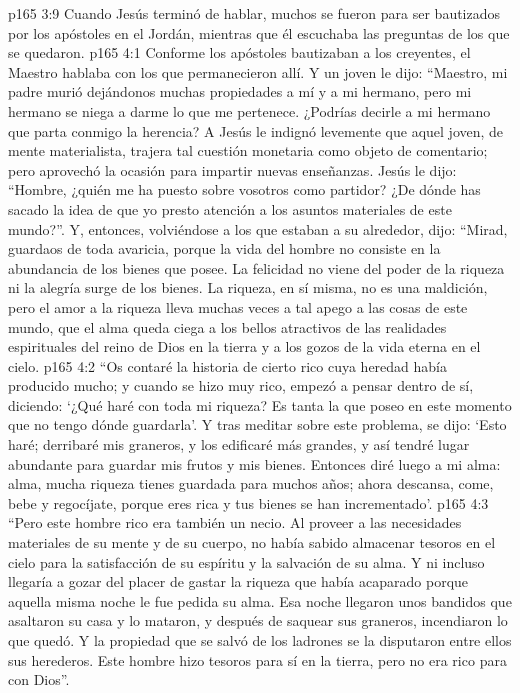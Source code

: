\vs p165 3:9 \pc Cuando Jesús terminó de hablar, muchos se fueron para ser bautizados por los apóstoles en el Jordán, mientras que él escuchaba las preguntas de los que se quedaron.
\vs p165 4:1 Conforme los apóstoles bautizaban a los creyentes, el Maestro hablaba con los que permanecieron allí. Y un joven le dijo: “Maestro, mi padre murió dejándonos muchas propiedades a mí y a mi hermano, pero mi hermano se niega a darme lo que me pertenece. ¿Podrías decirle a mi hermano que parta conmigo la herencia? A Jesús le indignó levemente que aquel joven, de mente materialista, trajera tal cuestión monetaria como objeto de comentario; pero aprovechó la ocasión para impartir nuevas enseñanzas. Jesús le dijo: “Hombre, ¿quién me ha puesto sobre vosotros como partidor? ¿De dónde has sacado la idea de que yo presto atención a los asuntos materiales de este mundo?”. Y, entonces, volviéndose a los que estaban a su alrededor, dijo: “Mirad, guardaos de toda avaricia, porque la vida del hombre no consiste en la abundancia de los bienes que posee. La felicidad no viene del poder de la riqueza ni la alegría surge de los bienes. La riqueza, en sí misma, no es una maldición, pero el amor a la riqueza lleva muchas veces a tal apego a las cosas de este mundo, que el alma queda ciega a los bellos atractivos de las realidades espirituales del reino de Dios en la tierra y a los gozos de la vida eterna en el cielo.
\vs p165 4:2 \pc “Os contaré la historia de cierto rico cuya heredad había producido mucho; y cuando se hizo muy rico, empezó a pensar dentro de sí, diciendo: ‘¿Qué haré con toda mi riqueza? Es tanta la que poseo en este momento que no tengo dónde guardarla’. Y tras meditar sobre este problema, se dijo: ‘Esto haré; derribaré mis graneros, y los edificaré más grandes, y así tendré lugar abundante para guardar mis frutos y mis bienes. Entonces diré luego a mi alma: alma, mucha riqueza tienes guardada para muchos años; ahora descansa, come, bebe y regocíjate, porque eres rica y tus bienes se han incrementado’.
\vs p165 4:3 “Pero este hombre rico era también un necio. Al proveer a las necesidades materiales de su mente y de su cuerpo, no había sabido almacenar tesoros en el cielo para la satisfacción de su espíritu y la salvación de su alma. Y ni incluso llegaría a gozar del placer de gastar la riqueza que había acaparado porque aquella misma noche le fue pedida su alma. Esa noche llegaron unos bandidos que asaltaron su casa y lo mataron, y después de saquear sus graneros, incendiaron lo que quedó. Y la propiedad que se salvó de los ladrones se la disputaron entre ellos sus herederos. Este hombre hizo tesoros para sí en la tierra, pero no era rico para con Dios”.
